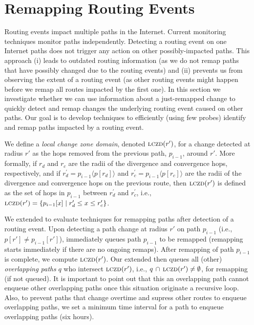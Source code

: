\section{Remapping Routing Events}
\label{sec:patching}

Routing events impact multiple paths in the Internet. Current
monitoring techniques monitor paths independently. Detecting
a routing event on one Internet paths does not trigger any action on
other possibly-impacted paths.  This approach (i) leads to outdated
routing information (as we do not remap paths that have possibly
changed due to the routing events) and (ii) prevents us from
observing the extent of a routing event (as other routing events
might happen before we remap all routes impacted by the first one).
In this section we investigate whether we can use information about
a just-remapped change to quickly detect and remap changes the
underlying routing event caused on other paths.  Our goal is to
develop techniques to efficiently (using few probes) identify and
remap paths impacted by a routing event.

\newcommand{\lczd}{\ensuremath\mathrm{\textsc{lczd}}}

We define a \emph{local change zone domain}, denoted $\lczd(r')$,
for a change detected at radius $r'$ as the hops removed from the
previous path, $p_{i-1}$, around $r'$. More formally, if $r_d$ and
$r_c$ are the radii of the divergence and convergence hops,
respectively, and if $r^\prime_d = p_{i-1}\langle p[r_d]\rangle$ and
$r^\prime_c = p_{i-1}\langle p[r_c]\rangle$ are the radii of the
divergence and convergence hops on the previous route, then
$\lczd(r')$ is defined as the set of hops in $p_{i-1}$ between
$r^\prime_d$ and $r^\prime_c$, i.e., $\lczd(r') = \{p_{i-1}[x]
\mid{} r^\prime_d \le x \le r^\prime_c\}$.

We extended \dtrack{} to evaluate techniques for remapping paths
after detection of a routing event.  Upon detecting a path change at
radius $r'$ on path $p_{i-1}$ (i.e., $p[r'] \ne p_{i-1}[r']$),
\dtrack{} immediately queues path $p_{i-1}$ to be remapped
(remapping starts immediately if there are no ongoing remaps).
After remapping of path $p_{i-1}$ is complete, we compute
$\lczd(r')$. Our extended \dtrack{} then queues all (other)
\emph{overlapping paths} $q$ who intersect $\lczd(r')$, i.e., $q\,
\cap\,\lczd(r') \ne \emptyset$, for remapping (if not queued). It is important to point out that this 
an overlapping path cannot enqueue other overlapping paths once this situation 
originate a recursive loop. Also, to prevent paths that change
overtime and supress other routes to enqueue overlapping paths,
we set a minimum time interval for a path to enqueue overlapping paths
(six hours). 

